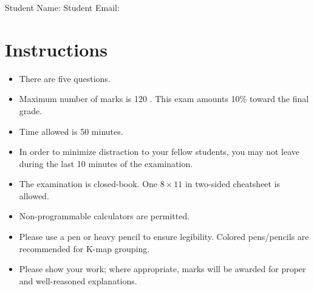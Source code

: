 \maketitle

Student Name: \hfill Student Email: \hspace{10em}
\section{Instructions}
\begin{itemize}
\item  There are five questions.
\item Maximum number of marks is 120 . This exam
  amounts 10\% toward the final grade.
  \item Time allowed is 50 minutes.
  \item In order to minimize distraction to your fellow students, you may not leave
  during the last 10 minutes of the examination.
  \item The examination is closed-book. One $8\times11$ in two-sided cheatsheet is allowed.
  \item Non-programmable calculators are permitted.
  \item Please use a pen or heavy pencil to ensure legibility. Colored
    pens/pencils are recommended for K-map grouping.
  \item Please show your work; where appropriate, marks will be awarded for proper and well-reasoned explanations.
\end{itemize}

